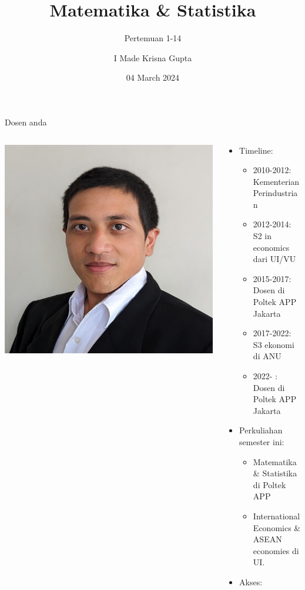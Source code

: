 \documentclass[
  ignorenonframetext,
]{beamer}
\title{Matematika \& Statistika}
\subtitle{Pertemuan 1-14}
\author{I Made Krisna Gupta}
\date{04 March 2024}
\begin{document}
\frame{\titlepage}

\begin{frame}{Dosen anda}
\label{dosen-anda}
\begin{columns}[T]
\begin{column}{0.4\textwidth}
\includegraphics{index_files/mediabag/foto_krisna.jpg}
\end{column}

\begin{column}{0.6\textwidth}
\begin{itemize}
\item
  Timeline:

  \begin{itemize}
  \item
    2010-2012: Kementerian Perindustrian
  \item
    2012-2014: S2 in economics dari UI/VU
  \item
    2015-2017: Dosen di Poltek APP Jakarta
  \item
    2017-2022: S3 ekonomi di ANU
  \item
    2022- : Dosen di Poltek APP Jakarta
  \end{itemize}
\item
  Perkuliahan semester ini:

  \begin{itemize}
  \item
    Matematika \& Statistika di Poltek APP
  \item
    International Economics \& ASEAN economies di UI.
  \end{itemize}
\item
  Akses:


\end{itemize}
\end{column}
\end{columns}
\end{frame}
\end{document}
